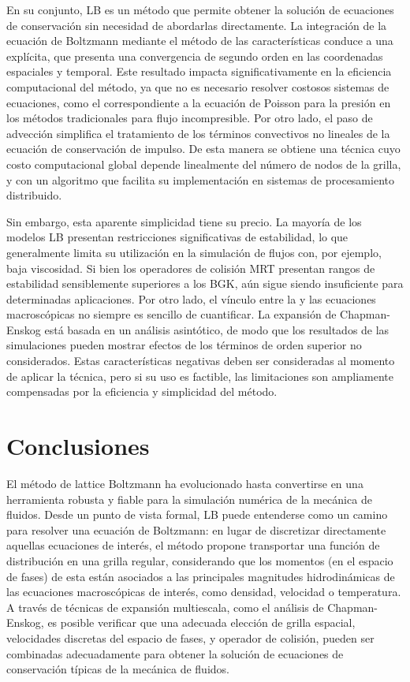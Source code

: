 En su conjunto, LB es un m\'etodo que permite obtener la soluci\'on de ecuaciones de conservaci\'on sin necesidad de abordarlas directamente. La integraci\'on de la ecuaci\'on de Boltzmann mediante el m\'etodo de las caracter\'isticas conduce a una \lbe{} expl\'icita, que presenta una convergencia de segundo orden en las coordenadas espaciales y temporal. Este resultado impacta significativamente en la eficiencia computacional del m\'etodo, ya que no es necesario resolver costosos sistemas de ecuaciones, como el correspondiente a la ecuaci\'on de Poisson para la presi\'on en los m\'etodos tradicionales para flujo incompresible. Por otro lado, el paso de advecci\'on simplifica el tratamiento de los t\'erminos convectivos no lineales de la ecuaci\'on de conservaci\'on de impulso. De esta manera se obtiene una t\'ecnica cuyo costo computacional global depende linealmente del n\'umero de nodos de la grilla, y con un algoritmo que facilita su implementaci\'on en sistemas de procesamiento distribuido. 

Sin embargo, esta aparente simplicidad tiene su precio. La mayor\'ia de los modelos LB presentan restricciones significativas de estabilidad, lo que generalmente limita su utilizaci\'on en la simulaci\'on de flujos con, por ejemplo, baja viscosidad. Si bien los operadores de colisi\'on MRT presentan rangos de estabilidad sensiblemente superiores a los BGK, a\'un sigue siendo insuficiente para determinadas aplicaciones. Por otro lado, el v\'inculo entre la \lbe{} y las ecuaciones macrosc\'opicas no siempre es sencillo de cuantificar. La expansi\'on de Chapman-Enskog est\'a basada en un an\'alisis asint\'otico, de modo que los resultados de las simulaciones pueden mostrar efectos de los t\'erminos de orden superior no considerados. Estas caracter\'isticas negativas deben ser consideradas al momento de aplicar la t\'ecnica, pero si su uso es factible, las limitaciones son ampliamente compensadas por la eficiencia y simplicidad del m\'etodo.


\section{Conclusiones}

El m\'etodo de lattice Boltzmann ha evolucionado hasta convertirse en una herramienta robusta y fiable para la simulaci\'on num\'erica de la mec\'anica de fluidos. Desde un punto de vista formal, LB puede entenderse como un camino para resolver una ecuaci\'on de Boltzmann: en lugar de discretizar directamente aquellas ecuaciones de inter\'es, el m\'etodo propone transportar una funci\'on de distribuci\'on en una grilla regular, considerando que los momentos (en el espacio de fases) de esta \fdp{} est\'an asociados a las principales magnitudes hidrodin\'amicas de las ecuaciones macrosc\'opicas de inter\'es, como densidad, velocidad o temperatura. A trav\'es de t\'ecnicas de expansi\'on multiescala, como el an\'alisis de Chapman-Enskog, es posible verificar que una adecuada elecci\'on de grilla espacial, velocidades discretas del espacio de fases, y operador de colisi\'on, pueden ser combinadas adecuadamente para obtener la soluci\'on de ecuaciones de conservaci\'on t\'ipicas de la mec\'anica de fluidos. 

